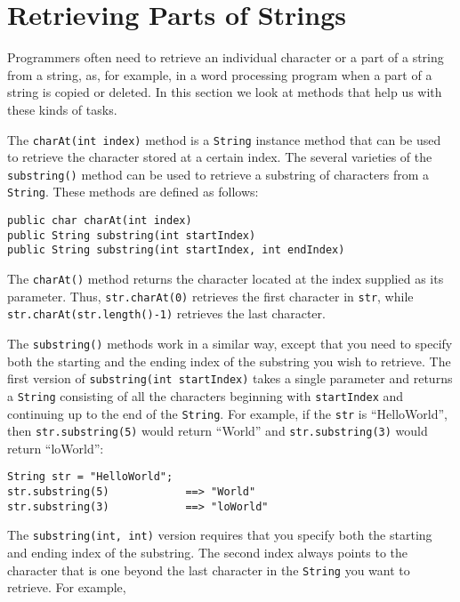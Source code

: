 \section{Retrieving Parts of Strings}
\noindent Programmers often need to retrieve an individual character or
a part of a string from a string, as, for example, in a word
processing program when a part of a string is copied or deleted. In
this section we look at methods that help us with these kinds of tasks.

The {\tt charAt(int index)} method is a {\tt String} instance method
that can be used to retrieve the character stored at a certain
index.  The several varieties of the {\tt substring()} method can be
used to retrieve a substring of characters from a {\tt String}. These
methods are defined as follows:

\begin{jjjlisting}
\begin{lstlisting}
public char charAt(int index)
public String substring(int startIndex)
public String substring(int startIndex, int endIndex)
\end{lstlisting}
\end{jjjlisting}

\noindent The {\tt charAt()} method
returns the character located at the index supplied as its parameter.
Thus, {\tt str.charAt(0)} retrieves the first character in {\tt str},
while {\tt str.charAt(str.length()-1)} retrieves the last character.

The {\tt substring()} methods work in a
similar way, except that you need to specify both the starting and the
ending index of the substring you wish to retrieve.  The first version
of {\tt substring(int startIndex)} takes a single parameter and
returns a {\tt String} consisting of all the characters beginning with
{\tt startIndex} and continuing up to the end of the {\tt String}. For
example, if the {\tt str} is ``HelloWorld'', then {\tt str.substring(5)}
would return ``World'' and {\tt str.substring(3)} would return
``loWorld'':

\begin{jjjlisting}
\begin{lstlisting}
String str = "HelloWorld";
str.substring(5)            ==> "World"
str.substring(3)            ==> "loWorld"
\end{lstlisting}
\end{jjjlisting}

\noindent The {\tt substring(int, int)} version requires that you specify both
the starting and ending index of the substring.   The second
index always points to the character that is one beyond the last
character in the {\tt String} you want to retrieve.  For example,

